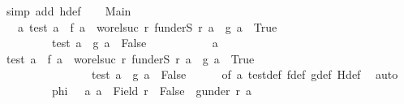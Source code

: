 \begin{isabellebody}
\ {\isacharparenleft}{\kern0pt}simp\ add{\isacharcolon}{\kern0pt}\ h{\isacharunderscore}{\kern0pt}def{\isacharparenright}{\kern0pt}\isanewline
\ \ \isamarkupfalse%
\ Main{}{\isacharcolon}{\kern0pt}\isanewline
\ \ {\isachardoublequoteopen}{\isasymAnd}\ a{\isachardot}{\kern0pt}\ {\isacharparenleft}{\kern0pt}test\ a\ {\isasymlongrightarrow}\ f\ a\ {\isacharequal}{\kern0pt}\ wo{\isacharunderscore}{\kern0pt}rel{\isachardot}{\kern0pt}suc\ r{\isacharprime}{\kern0pt}\ {\isacharparenleft}{\kern0pt}f{\isacharbackquote}{\kern0pt}{\isacharparenleft}{\kern0pt}underS\ r\ a{\isacharparenright}{\kern0pt}{\isacharparenright}{\kern0pt}\ {\isasymand}\ g\ a\ {\isacharequal}{\kern0pt}\ True{\isacharparenright}{\kern0pt}\ {\isasymand}\isanewline
\ \ \ \ \ \ \ \ \ {\isacharparenleft}{\kern0pt}{\isasymnot}{\isacharparenleft}{\kern0pt}test\ a{\isacharparenright}{\kern0pt}\ {\isasymlongrightarrow}\ g\ a\ {\isacharequal}{\kern0pt}\ False{\isacharparenright}{\kern0pt}{\isachardoublequoteclose}\isanewline
\ \ \isamarkupfalse%
{\isacharminus}{\kern0pt}\ \ \isanewline
\ \ \ \ \isamarkupfalse%
\ a\ \isamarkupfalse%
\ {\isachardoublequoteopen}{\isacharparenleft}{\kern0pt}test\ a\ {\isasymlongrightarrow}\ f\ a\ {\isacharequal}{\kern0pt}\ wo{\isacharunderscore}{\kern0pt}rel{\isachardot}{\kern0pt}suc\ r{\isacharprime}{\kern0pt}\ {\isacharparenleft}{\kern0pt}f{\isacharbackquote}{\kern0pt}{\isacharparenleft}{\kern0pt}underS\ r\ a{\isacharparenright}{\kern0pt}{\isacharparenright}{\kern0pt}\ {\isasymand}\ g\ a\ {\isacharequal}{\kern0pt}\ True{\isacharparenright}{\kern0pt}\ {\isasymand}\isanewline
\ \ \ \ \ \ \ \ \ \ \ \ \ \ \ \ {\isacharparenleft}{\kern0pt}{\isasymnot}{\isacharparenleft}{\kern0pt}test\ a{\isacharparenright}{\kern0pt}\ {\isasymlongrightarrow}\ g\ a\ {\isacharequal}{\kern0pt}\ False{\isacharparenright}{\kern0pt}{\isachardoublequoteclose}\isanewline
\ \ \ \ \isamarkupfalse%
\ {\isacharasterisk}{\kern0pt}{\isacharbrackleft}{\kern0pt}of\ a{\isacharbrackright}{\kern0pt}\ test{\isacharunderscore}{\kern0pt}def\ f{\isacharunderscore}{\kern0pt}def\ g{\isacharunderscore}{\kern0pt}def\ H{\isacharunderscore}{\kern0pt}def\ \isamarkupfalse%
\ auto\isanewline
\ \ \isamarkupfalse%
\isanewline
\ \ \isanewline
\ \ \isamarkupfalse%
\ {\isacharquery}{\kern0pt}phi\ {\isacharequal}{\kern0pt}\ {\isachardoublequoteopen}{\isasymlambda}\ a{\isachardot}{\kern0pt}\ a\ {\isasymin}\ Field\ r\ {\isasymand}\ False\ {\isasymnotin}\ g{\isacharbackquote}{\kern0pt}{\isacharparenleft}{\kern0pt}under\ r\ a{\isacharparenright}{\kern0pt}\ {\isasymlongrightarrow}\isanewline

\end{isabellebody}
